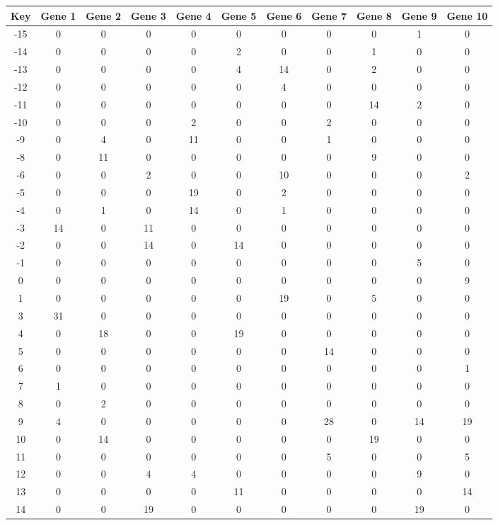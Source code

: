 \begin{tabular}{|c|c|c|c|c|c|c|c|c|c|c|}
\hline
Key & Gene 1 & Gene 2 & Gene 3 & Gene 4 & Gene 5 & Gene 6 & Gene 7 & Gene 8 & Gene 9 & Gene 10 \\
\hline
-15 & 0 & 0 & 0 & 0 & 0 & 0 & 0 & 0 & 1 & 0 \\
-14 & 0 & 0 & 0 & 0 & 2 & 0 & 0 & 1 & 0 & 0 \\
-13 & 0 & 0 & 0 & 0 & 4 & 14 & 0 & 2 & 0 & 0 \\
-12 & 0 & 0 & 0 & 0 & 0 & 4 & 0 & 0 & 0 & 0 \\
-11 & 0 & 0 & 0 & 0 & 0 & 0 & 0 & 14 & 2 & 0 \\
-10 & 0 & 0 & 0 & 2 & 0 & 0 & 2 & 0 & 0 & 0 \\
-9 & 0 & 4 & 0 & 11 & 0 & 0 & 1 & 0 & 0 & 0 \\
-8 & 0 & 11 & 0 & 0 & 0 & 0 & 0 & 9 & 0 & 0 \\
-6 & 0 & 0 & 2 & 0 & 0 & 10 & 0 & 0 & 0 & 2 \\
-5 & 0 & 0 & 0 & 19 & 0 & 2 & 0 & 0 & 0 & 0 \\
-4 & 0 & 1 & 0 & 14 & 0 & 1 & 0 & 0 & 0 & 0 \\
-3 & 14 & 0 & 11 & 0 & 0 & 0 & 0 & 0 & 0 & 0 \\
-2 & 0 & 0 & 14 & 0 & 14 & 0 & 0 & 0 & 0 & 0 \\
-1 & 0 & 0 & 0 & 0 & 0 & 0 & 0 & 0 & 5 & 0 \\
0 & 0 & 0 & 0 & 0 & 0 & 0 & 0 & 0 & 0 & 9 \\
1 & 0 & 0 & 0 & 0 & 0 & 19 & 0 & 5 & 0 & 0 \\
3 & 31 & 0 & 0 & 0 & 0 & 0 & 0 & 0 & 0 & 0 \\
4 & 0 & 18 & 0 & 0 & 19 & 0 & 0 & 0 & 0 & 0 \\
5 & 0 & 0 & 0 & 0 & 0 & 0 & 14 & 0 & 0 & 0 \\
6 & 0 & 0 & 0 & 0 & 0 & 0 & 0 & 0 & 0 & 1 \\
7 & 1 & 0 & 0 & 0 & 0 & 0 & 0 & 0 & 0 & 0 \\
8 & 0 & 2 & 0 & 0 & 0 & 0 & 0 & 0 & 0 & 0 \\
9 & 4 & 0 & 0 & 0 & 0 & 0 & 28 & 0 & 14 & 19 \\
10 & 0 & 14 & 0 & 0 & 0 & 0 & 0 & 19 & 0 & 0 \\
11 & 0 & 0 & 0 & 0 & 0 & 0 & 5 & 0 & 0 & 5 \\
12 & 0 & 0 & 4 & 4 & 0 & 0 & 0 & 0 & 9 & 0 \\
13 & 0 & 0 & 0 & 0 & 11 & 0 & 0 & 0 & 0 & 14 \\
14 & 0 & 0 & 19 & 0 & 0 & 0 & 0 & 0 & 19 & 0 \\
\hline
\end{tabular}